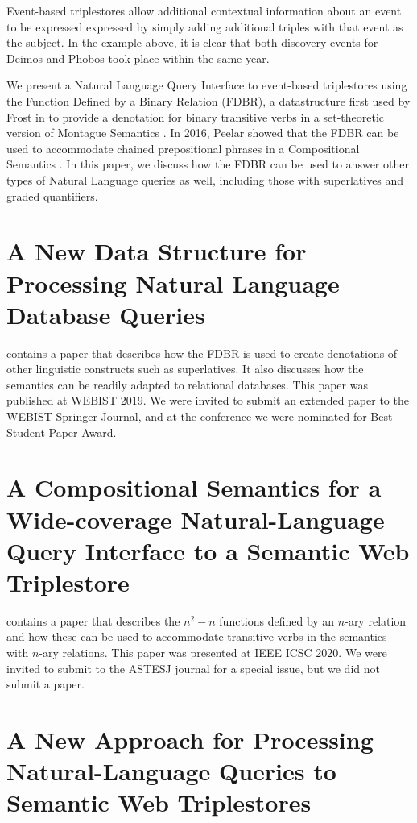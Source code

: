 \documentclass[../main.tex]{subfiles}
\begin{document}
\begin{refsection}
Event-based triplestores allow additional contextual information about an event to be expressed
expressed by simply adding additional triples with that event as the subject.  In the example
above, it is clear that both discovery events for Deimos and Phobos took place within the same year.

We present a Natural Language Query Interface to event-based triplestores using the Function Defined
by a Binary Relation (FDBR), a datastructure first used by Frost in \cite{frost1989constructing}
to provide a denotation for binary transitive verbs in a set-theoretic version of Montague Semantics \cite{Dowty:wall}.  In 2016, Peelar showed that the FDBR can be used to accommodate chained
prepositional phrases in a Compositional Semantics \cite{peelar2016accommodating}.  In this paper,
we discuss how the FDBR can be used to answer other types of Natural Language queries as well, including
those with superlatives and graded quantifiers.

\section{A New Data Structure for Processing Natural Language Database Queries}

\textbf{} contains a paper that describes how the FDBR is used
to create denotations of other linguistic constructs such as superlatives.  It also discusses
how the semantics can be readily adapted to relational databases.  This paper was published at WEBIST 2019.  We were invited to submit an extended paper to the WEBIST Springer Journal, and at the conference we were nominated for Best Student Paper Award.

\section{A Compositional Semantics for a Wide-coverage Natural-Language Query Interface to a Semantic Web Triplestore}

\textbf{} contains a paper that describes the $n^2 - n$ functions defined by an $n$-ary relation and how these can be used to accommodate transitive verbs in the semantics with $n$-ary relations.  This paper was presented at IEEE ICSC 2020.  We were invited to submit to the ASTESJ journal for a special issue, but we did not submit a paper.

\section{A New Approach for Processing Natural-Language Queries to Semantic Web Triplestores}


\end{refsection}
\end{document}
